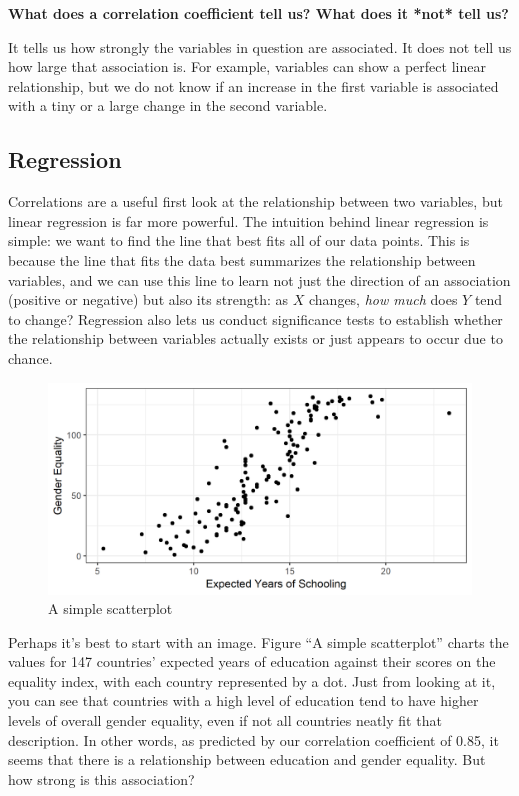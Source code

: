 \documentclass{book}
\newenvironment{shaded*}{
    \begin{center}
    \begin{tabular}{|p{0.9\textwidth}|}
    \hline\\
    }
    { 
    \\\\\hline
    \end{tabular} 
    \end{center}
}
\begin{document}
\textbf{What does a correlation coefficient tell us? What does it *not* tell us?}

\begin{shaded*}

It tells us how strongly the variables in question are associated. It does not
tell us how large that association is. For example, variables can show a
perfect linear relationship, but we do not know if an increase in the first
variable is associated with a tiny or a large change in the second variable.

\end{shaded*}

\hypertarget{regression}{%
\subsection{Regression}\label{regression}}

Correlations are a useful first look at the relationship between two
variables, but linear regression is far more powerful. The intuition behind
linear regression is simple: we want to find the line that best fits all of
our data points. This is because the line that fits the data best summarizes
the relationship between variables, and we can use this line to learn not just
the direction of an association (positive or negative) but also its strength:
as \(X\) changes, \emph{how much} does \(Y\) tend to change? Regression also
lets us conduct significance tests to establish whether the relationship
between variables actually exists or just appears to occur due to chance.

\begin{figure}
\centering
\includegraphics{images/largen/scatter.png}
\caption{A simple scatterplot}
\end{figure}

Perhaps it's best to start with an image. Figure ``A simple scatterplot''
charts the values for 147 countries' expected years of education against their
scores on the equality index, with each country represented by a dot. Just
from looking at it, you can see that countries with a high level of education
tend to have higher levels of overall gender equality, even if not all
countries neatly fit that description. In other words, as predicted by our
correlation coefficient of 0.85, it seems that there is a relationship between
education and gender equality. But how strong is this association?
\end{document}
